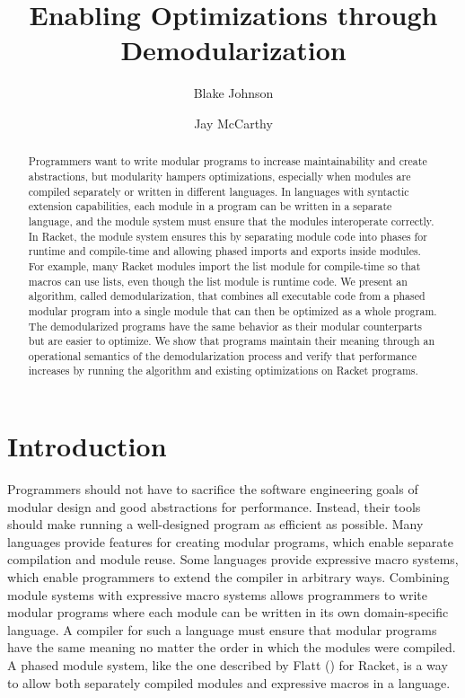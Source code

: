 \documentclass{llncs}
\begin{document}
\title{Enabling Optimizations through Demodularization} 
\author{Blake Johnson \and Jay McCarthy}
\maketitle
\begin{abstract}
Programmers want to write modular programs to increase maintainability and create abstractions, but modularity hampers optimizations, especially when modules are compiled separately or written in different languages. 
In languages with syntactic extension capabilities, each module in a program can be written in a separate language, and the module system must ensure that the modules interoperate correctly. 
In Racket, the module system ensures this by separating module code into phases for runtime and compile-time and allowing phased imports and exports inside modules. 
For example, many Racket modules import the list module for compile-time so that macros can use lists, even though the list module is runtime code.
We present an algorithm, called demodularization, that combines all executable code from a phased modular program into a single module that can then be optimized as a whole program. 
The demodularized programs have the same behavior as their modular counterparts but are easier to optimize. 
We show that programs maintain their meaning through an operational semantics of the demodularization process and verify that performance increases by running the algorithm and existing optimizations on Racket programs.
\end{abstract}

\section{Introduction}

Programmers should not have to sacrifice the software engineering goals of modular design and good abstractions for performance. 
Instead, their tools should make running a well-designed program as efficient as possible. 
Many languages provide features for creating modular programs, which enable separate compilation and module reuse.
Some languages provide expressive macro systems, which enable programmers to extend the compiler in arbitrary ways.
Combining module systems with expressive macro systems allows programmers to write modular programs where each module can be written in its own domain-specific language.
A compiler for such a language must ensure that modular programs have the same meaning no matter the order in which the modules were compiled.
A phased module system, like the one described by Flatt () for Racket, is a way to allow both separately compiled modules and expressive macros in a language.
\end{document}
